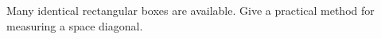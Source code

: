 Many identical rectangular boxes are available. Give a practical method for measuring a space diagonal.

